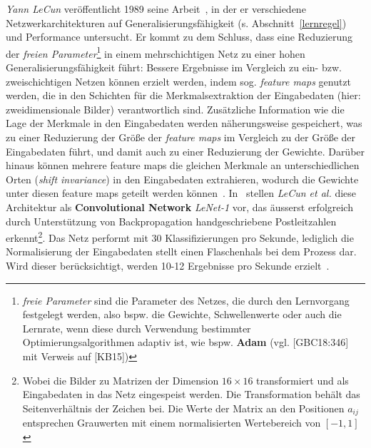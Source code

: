 \textit{Yann LeCun} veröffentlicht 1989 seine Arbeit~\cite{Cun89}, in der er verschiedene Netzwerkarchitekturen auf Generalisierungsfähigkeit (s. Abschnitt~\ref{lernregel}) und Performance untersucht. Er kommt zu dem Schluss, dass eine Reduzierung der \textit{freien Parameter}\footnote{
    \textit{freie Parameter} sind die Parameter des Netzes, die durch den Lernvorgang festgelegt werden, also bspw. die Gewichte, Schwellenwerte oder auch die Lernrate, wenn diese durch Verwendung bestimmter Optimierungsalgorithmen adaptiv ist, wie bspw. \textbf{Adam} (vgl. [GBC18:346] mit Verweis auf [KB15])
} in einem mehrschichtigen Netz zu einer hohen Generalisierungsfähigkeit führt: Bessere Ergebnisse im Vergleich zu  ein- bzw. zweischichtigen Netzen können erzielt werden, indem sog. \textit{feature maps} genutzt werden, die in den Schichten für die Merkmalsextraktion der Eingabedaten (hier: zweidimensionale Bilder) verantwortlich sind.
Zusätzliche Information wie die Lage der Merkmale in den Eingabedaten werden näherungsweise gespeichert, was zu einer Reduzierung der Größe der \textit{feature maps} im Vergleich zu der Größe der Eingabedaten führt, und damit auch zu einer Reduzierung der Gewichte.
Darüber hinaus können mehrere feature maps die gleichen Merkmale an unterschiedlichen Orten (\textit{shift invariance}) in den Eingabedaten extrahieren, wodurch die Gewichte unter diesen feature maps geteilt werden können~\cite[151 f.]{Cun89}.
In~\cite{CBD+89} stellen \textit{LeCun et al.} diese Architektur als \textbf{Convolutional Network} \textit{LeNet-1}  vor\cite[13]{CBBH98}, das äusserst erfolgreich durch Unterstützung von Backpropagation  handgeschriebene Postleitzahlen erkennt\footnote{
    Wobei die Bilder zu Matrizen der Dimension $16 \times 16$ transformiert und als Eingabedaten in das Netz eingespeist werden. Die Transformation behält das Seitenverhältnis der Zeichen bei. Die Werte der Matrix an den Positionen $a_{ij}$ entsprechen Grauwerten mit einem normalisierten Wertebereich von $[-1, 1]$\cite[542]{CBD+89}
}. Das Netz performt mit 30 Klassifizierungen pro Sekunde, lediglich die Normalisierung der Eingabedaten stellt einen Flaschenhals bei dem Prozess dar. Wird dieser berücksichtigt, werden 10-12 Ergebnisse pro Sekunde erzielt~\cite[549]{CBD+89}.\\



